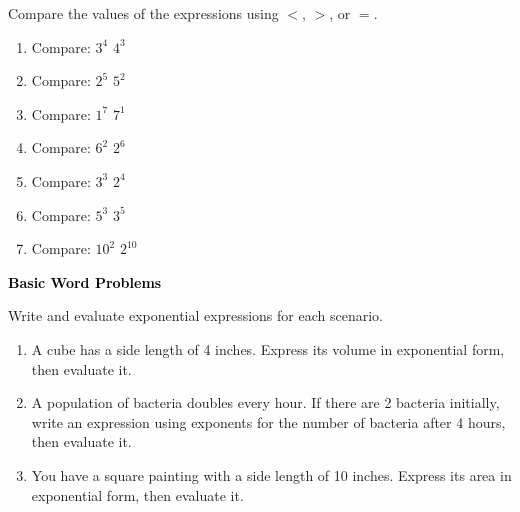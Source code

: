 \documentclass[12pt, letterpaper, fleqn]{article}
\newcommand{\blankshorter}{\underline{\hspace{1.5cm}}}
\begin{document}
\noindent
Compare the values of the expressions using $<$, $>$, or $=$.

\vspace{3mm}

\begin{enumerate}[itemsep=1cm, leftmargin=0.6cm]
    \item Compare: $3^4$ \quad \blankshorter \quad $4^3$
    \vspace{1cm}
    \item Compare: $2^5$ \quad \blankshorter \quad $5^2$
    \vspace{1cm}
    \item Compare: $1^7$ \quad \blankshorter \quad $7^1$
    \vspace{1cm}
    \item Compare: $6^2$ \quad \blankshorter \quad $2^6$
    \vspace{1cm}
    \item Compare: $3^3$ \quad \blankshorter \quad $2^4$
    \vspace{1cm}
    \item Compare: $5^3$ \quad \blankshorter \quad $3^5$
    \vspace{1cm}
    \item Compare: $10^2$ \quad \blankshorter \quad $2^{10}$
    \vspace{1cm}
\end{enumerate}

\newpage

\begin{tcolorbox}[colback=black!10]
\large\textcolor{black}{\textbf{Basic Word Problems}}
\end{tcolorbox}

\noindent
Write and evaluate exponential expressions for each scenario.

\vspace{3mm}

\begin{enumerate}[itemsep=2.2cm, leftmargin=0.6cm]

\item A cube has a side length of 4 inches. Express its volume in exponential form, then evaluate it.

\vspace{2.2cm}

\item A population of bacteria doubles every hour. If there are 2 bacteria initially, write an expression using exponents for the number of bacteria after 4 hours, then evaluate it.

\vspace{2.2cm}

\item You have a square painting with a side length of 10 inches. Express its area in exponential form, then evaluate it.

\vspace{2.2cm}

\end{enumerate}
\end{document}
